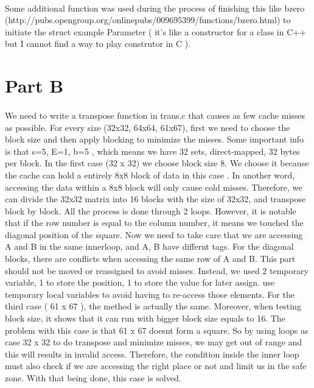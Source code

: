 \documentclass[a4paper]{article}
\begin{document}
\paragraph{} 
Some additional function was used during the process of finishing this like bzero (http://pubs.opengroup.org/onlinepubs/009695399/functions/bzero.html) to initiate the struct example Parameter ( it's like a constructor for a class in C++ but I cannot find a way to play construtor in C ).



\newpage
\section{Part B}

\paragraph{}
We need to  write a transpose function in trans.c that causes as few cache misses as possible. For every size (32x32, 64x64, 61x67), first we need to choose the block size and then apply blocking to minimize the misses.
Some important info is that  s=5, E=1, b=5 , which means we have 32 sets, direct-mapped, 32 bytes per block.  
In the first case (32 x 32) we choose block size 8. We choose it because the cache can hold a entirely 8x8 block of data in this case . In another word, accessing the data within a 8x8 block will only cause cold misses. Therefore, we can divide the 32x32 matrix into 16 blocks with the size of 32x32, and transpose block by block. All the process is done through 2 loops. However, it is notable that if the row number is equal to the column number, it means we touched the diagonal position of the square. Now we need to take care that we are accessing A and B in the same innerloop, and A, B have differnt tags. For the diagonal blocks, there are conflicts when accessing the same row of A and B. This part should not be moved or reassigned to avoid misses. Instead, we used 2 temporary variable, 1 to store the position, 1 to store the value for later assign.  use temporary local variables to avoid having to re-access those elements. For the third case ( 61 x 67 ), the method is actually the same. Moreover, when testing block size, it shows that it can run with bigger block size equals to 16. The problem with this case is that 61 x 67 doesnt form a square. So by using loops as case 32 x 32 to do transpose and minimize misses, we may get out of range and this will results in invalid access. Therefore, the condition inside the inner loop must also check if we are accessing the right place or not and limit us in the safe zone. With that being done, this case is solved.
\end{document}
